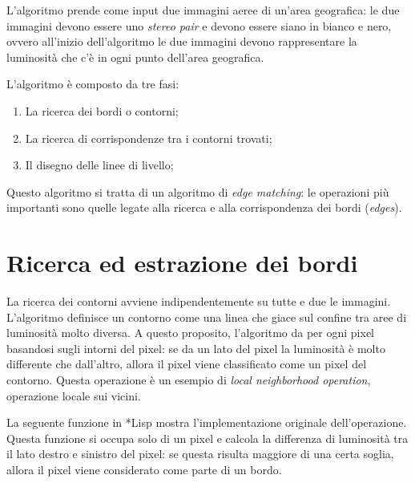 \documentclass[12pt,a4paper,openright,twoside]{report}
\begin{document}
L'algoritmo prende come input due immagini aeree di un'area geografica: le due immagini devono essere uno \textit{stereo pair} e devono essere siano in bianco e nero, ovvero all'inizio dell'algoritmo le due immagini devono rappresentare la luminosità che c'è in ogni punto dell'area geografica.

L'algoritmo è composto da tre fasi:

\begin{enumerate}
    \item La ricerca dei bordi o contorni;
    \item La ricerca di corrispondenze tra i contorni trovati;
    \item Il disegno delle linee di livello;
\end{enumerate}

Questo algoritmo si tratta di un algoritmo di \textit{edge matching}: le operazioni più importanti sono quelle legate alla ricerca e alla corrispondenza dei bordi (\textit{edges}).

\section{Ricerca ed estrazione dei bordi}

La ricerca dei contorni avviene indipendentemente su tutte e due le immagini. L'algoritmo definisce un contorno come una linea che giace sul confine tra aree di luminosità molto diversa. A questo proposito, l'algoritmo da per ogni pixel basandosi sugli intorni del pixel: se da un lato del pixel la luminosità è molto differente che dall'altro, allora il pixel viene classificato come un pixel del contorno. Questa operazione è un esempio di \textit{local neighborhood operation}, operazione locale sui vicini.

La seguente funzione in *Lisp mostra l'implementazione originale dell'operazione. Questa funzione si occupa solo di un pixel e calcola la differenza di luminosità tra il lato destro e sinistro del pixel: se questa risulta maggiore di una certa soglia, allora il pixel viene considerato come parte di un bordo.
\end{document}

